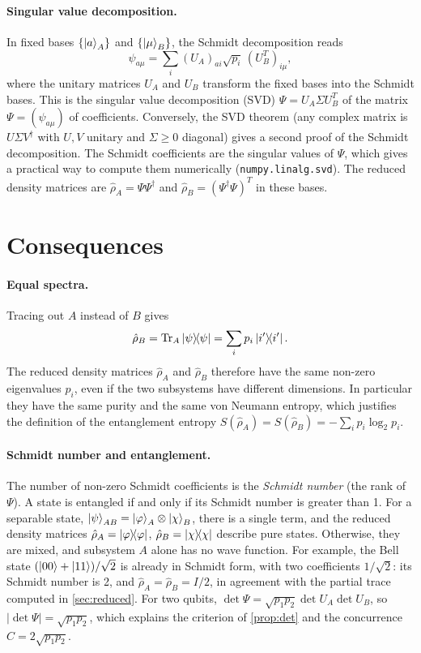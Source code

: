 \paragraph{Singular value decomposition.} In fixed bases $\{\left|a\right\rangle_A\}$ and $\{\left|\mu\right\rangle_B\}$, the Schmidt decomposition reads
\begin{equation}
  \psi_{a\mu}=\sum_i(U_A)_{ai}\sqrt{p_i}\,(U_B^T)_{i\mu},
\end{equation}
where the unitary matrices $U_A$ and $U_B$ transform the fixed bases into the Schmidt bases. This is the singular value decomposition (SVD) $\Psi=U_A\Sigma U_B^T$ of the matrix $\Psi=(\psi_{a\mu})$ of coefficients. Conversely, the SVD theorem
(any complex matrix is $U\Sigma V^\dagger$ with $U,V$ unitary and $\Sigma\ge0$ diagonal) gives a second proof of the Schmidt decomposition. The Schmidt coefficients are the singular values of $\Psi$, which gives a practical way to compute them
numerically (\texttt{numpy.linalg.svd}). The reduced density matrices are $\hat\rho_A=\Psi\Psi^\dagger$ and $\hat\rho_B=(\Psi^\dagger\Psi)^T$ in these bases.

\section{Consequences}
\paragraph{Equal spectra.} Tracing out $A$ instead of $B$ gives
\begin{equation}
  \hat\rho_B=\operatorname{Tr}_A\left|\psi\middle\rangle\!\middle\langle\psi\right|=\sum_ip_i\left|i'\middle\rangle\!\middle\langle i'\right|.
\end{equation}
The reduced density matrices $\hat\rho_A$ and $\hat\rho_B$ therefore have the same non-zero eigenvalues $p_i$, even if the two subsystems have different dimensions. In particular they have the same purity and the same von Neumann entropy,
which justifies the definition of the entanglement entropy $S(\hat\rho_A)=S(\hat\rho_B)=-\sum_ip_i\log_2p_i$.

\paragraph{Schmidt number and entanglement.} The number of non-zero Schmidt coefficients is the \emph{Schmidt number} (the rank of $\Psi$). A state is entangled if and only if its Schmidt number is greater than 1. For a separable state,
$\left|\psi\right\rangle_{AB}=\left|\varphi\right\rangle_A\otimes\left|\chi\right\rangle_B$, there is a single term, and the reduced density matrices $\hat\rho_A=\left|\varphi\middle\rangle\!\middle\langle\varphi\right|$, $\hat\rho_B=\left|\chi\middle\rangle\!\middle\langle\chi\right|$ describe pure states. Otherwise, they are mixed, and subsystem $A$ alone has no wave function.
For example, the Bell state $(\left|00\right\rangle+\left|11\right\rangle)/\sqrt2$ is already in Schmidt form, with two coefficients $1/\sqrt2$: its Schmidt number is 2, and $\hat\rho_A=\hat\rho_B=I/2$, in agreement with the partial trace computed in \cref{sec:reduced}.
For two qubits, $\det\Psi=\sqrt{p_1p_2}\det U_A\det U_B$, so $|\det\Psi|=\sqrt{p_1p_2}$, which explains the criterion of \cref{prop:det} and the concurrence $C=2\sqrt{p_1p_2}$.

